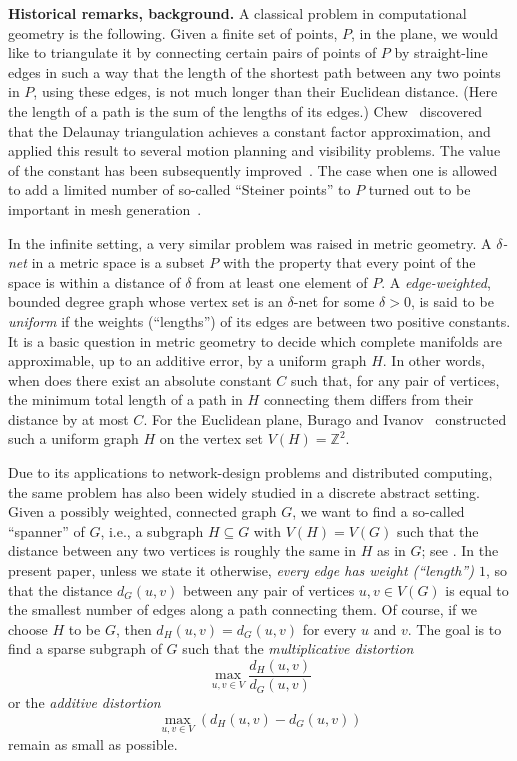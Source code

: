 \documentclass[12pt]{article}
\theoremstyle{plain}
\theoremstyle{definition}
\theoremstyle{remark}
\begin{document}
\textbf{Historical remarks, background.}
A classical problem in computational geometry is the following. Given a finite set of points, $P$, in the plane, we would like to triangulate it by connecting certain pairs of points of $P$ by straight-line edges in such a way that the length of the shortest path between any two points in $P$, using these edges, is not much longer than their Euclidean distance. (Here the length of a path is the sum of the lengths of its edges.) Chew~\cite{Ch86} discovered that the Delaunay triangulation achieves a constant factor approximation, and applied this result to several motion planning and visibility problems. The value of the constant has been subsequently improved~\cite{DoFS90, KeG92}. The case when one is allowed to add a limited number of so-called ``Steiner points'' to $P$ turned out to be important in mesh generation~\cite{BeSA17}.
\smallskip

In the infinite setting, a very similar problem was raised in metric geometry. A \emph{$\delta$-net} in a metric space is a subset $P$ with the property that every point of the space is within a distance of $\delta$ from at least one element of $P$.
A \emph{edge-weighted}, bounded degree graph whose vertex set is an $\delta$-net for some $\delta>0$, is said to be \emph{uniform} if the weights (``lengths'') of its edges are between two positive constants. It is a basic question in metric geometry to decide which complete manifolds are approximable, up to an additive error, by a uniform graph $H$. In other words, when does there exist an absolute constant $C$ such that, for any pair of vertices, the minimum total length of a path in $H$ connecting them differs from their distance by at most $C$. For the Euclidean plane, Burago and Ivanov~\cite{BuI15} constructed such a uniform graph $H$ on the vertex set $V(H)=\mathbb{Z}^2$.
\smallskip

Due to its applications to network-design problems and distributed computing, the same problem has also been widely studied in a discrete abstract setting. Given a possibly weighted, connected graph $G$, we want to find a so-called ``spanner'' of $G$, i.e., a subgraph $H\subseteq G$ with $V(H)=V(G)$ such that the distance between any two vertices is roughly the same in $H$ as in $G$; see \cite{PeS89, AhBD20}. In the present paper, unless we state it otherwise, \emph{every edge has weight (``length'') $1$}, so that the distance $d_G(u,v)$ between any pair of vertices $u,v\in V(G)$ is equal to the smallest number of edges along a path connecting them. Of course, if we choose $H$ to be $G$, then $d_H(u,v)=d_G(u,v)$ for every $u$ and $v$. The goal is to find a sparse subgraph of $G$ such that the \emph{multiplicative distortion} $$\max_{u,v\in V}\frac{d_H(u,v)}{d_G(u,v)}$$ or the \emph{additive distortion}
$$\max_{u,v\in V}\left(d_H(u,v)-d_G(u,v)\right)$$
remain as small as possible.
\smallskip
\end{document}
